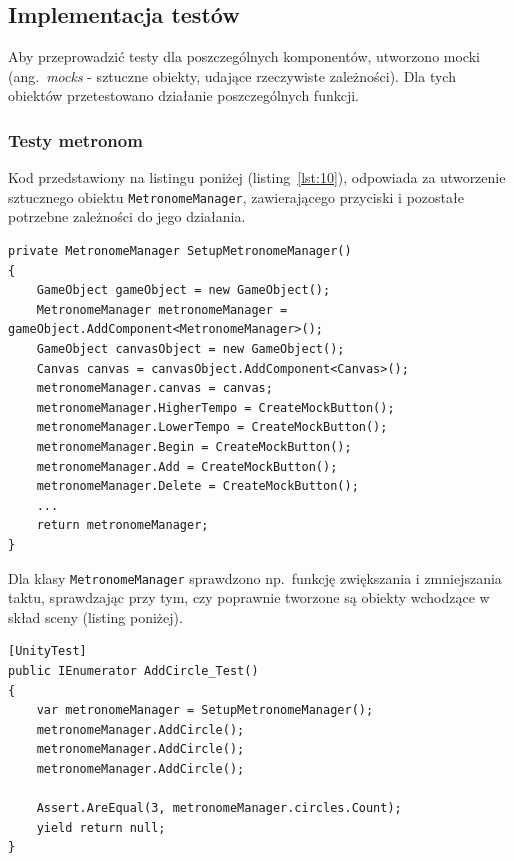 \subsection{Implementacja testów}

Aby przeprowadzić testy dla poszczególnych komponentów, utworzono mocki (ang.~\emph{mocks} - sztuczne obiekty, udające rzeczywiste zależności). Dla tych obiektów przetestowano działanie poszczególnych funkcji.

\subsubsection{Testy metronom}

Kod przedstawiony na listingu poniżej (listing~\ref{lst:10}), odpowiada za utworzenie sztucznego obiektu \texttt{MetronomeManager}, zawierającego przyciski i pozostałe potrzebne zależności do jego działania. 

\begin{lstlisting}[style=sharpcstyle,caption=Funkcja \texttt{SetupMetronomeManager}, label=lst:10]
private MetronomeManager SetupMetronomeManager()
{
    GameObject gameObject = new GameObject();
    MetronomeManager metronomeManager = gameObject.AddComponent<MetronomeManager>();
    GameObject canvasObject = new GameObject();
    Canvas canvas = canvasObject.AddComponent<Canvas>();
    metronomeManager.canvas = canvas;
    metronomeManager.HigherTempo = CreateMockButton();
    metronomeManager.LowerTempo = CreateMockButton();
    metronomeManager.Begin = CreateMockButton();
    metronomeManager.Add = CreateMockButton();
    metronomeManager.Delete = CreateMockButton();
    ...
    return metronomeManager;
}
\end{lstlisting}

Dla klasy \texttt{MetronomeManager} sprawdzono np.\ funkcję zwiększania i zmniejszania taktu, sprawdzając przy tym, czy poprawnie tworzone są obiekty wchodzące w skład sceny (listing poniżej).

\begin{lstlisting}[style=sharpcstyle,caption=Funkcja \texttt{AddCircle\_Test}, label=lst:20]
[UnityTest]
public IEnumerator AddCircle_Test()
{
    var metronomeManager = SetupMetronomeManager();    
    metronomeManager.AddCircle();
    metronomeManager.AddCircle();
    metronomeManager.AddCircle();
    
    Assert.AreEqual(3, metronomeManager.circles.Count);
    yield return null;
}
\end{lstlisting}

